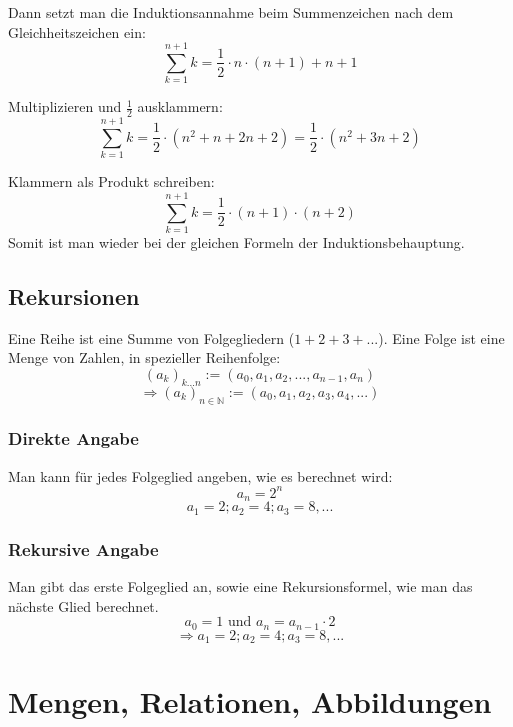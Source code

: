 Dann setzt man die Induktionsannahme beim Summenzeichen nach dem
Gleichheitszeichen ein:
 \[ \sum\limits_{k=1}^{n+1} k = \frac{1}{2} \cdot n \cdot (n + 1) + n + 1 \]

Multiplizieren und $\frac{1}{2}$ ausklammern:
 \[ \sum\limits_{k=1}^{n+1} k = \frac{1}{2} \cdot (n^2 + n + 2n + 2) =
 \frac{1}{2} \cdot (n^2 + 3n + 2) \]

Klammern als Produkt schreiben:
 \[ \sum\limits_{k=1}^{n+1} k = \frac{1}{2} \cdot (n + 1) \cdot (n + 2)\]
Somit ist man wieder bei der gleichen Formeln der Induktionsbehauptung.

\subsection{Rekursionen}
Eine Reihe ist eine Summe von Folgegliedern ($1 + 2 + 3 + ...$). Eine Folge ist eine Menge
von Zahlen, in spezieller Reihenfolge:
\[ (a_k)_{k...n} := (a_0, a_1, a_2, ..., a_{n-1}, a_n) \]
\[ \Rightarrow (a_k)_{n \in \mathbb{N}} := (a_0, a_1, a_2, a_3, a_4, ...) \]
\subsubsection{Direkte Angabe}
Man kann für jedes Folgeglied angeben, wie es berechnet wird:
\[ a_n = 2^n \]
\[ a_1 = 2; a_2 = 4; a_3 = 8, ... \]
\subsubsection{Rekursive Angabe}
Man gibt das erste Folgeglied an, sowie eine Rekursionsformel,
wie man das nächste Glied berechnet.
\[a_0 = 1 \text{ und } a_n = a_{n-1} \cdot 2 \]
\[ \Rightarrow a_1 = 2; a_2 = 4; a_3 = 8, ... \]

\section{Mengen, Relationen, Abbildungen}


